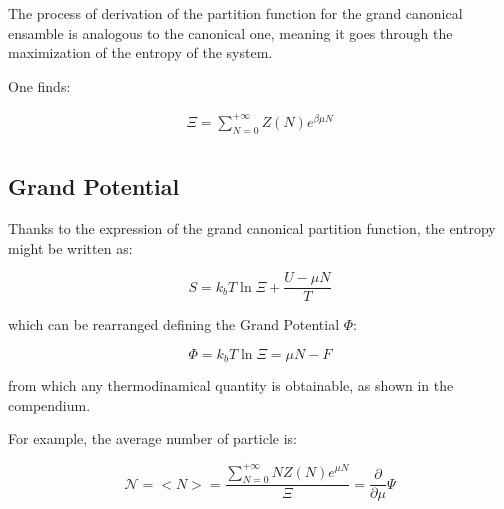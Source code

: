 \documentclass{article}
\begin{document}
The process of derivation of the partition function for the grand canonical ensamble is analogous to the canonical one,
meaning it goes through the maximization of the entropy of the system.

One finds:

\begin{equation}
    \begin{aligned}
        \Xi= \sum_{N=0}^{+\infty}Z(N)e^{\beta\mu N} \\
    \end{aligned}
\end{equation}

\subsection{Grand Potential}

Thanks to the expression of the grand canonical partition function, the
entropy might be written as:

\begin{equation}
    S= k_bT\ln{\Xi}+\frac{U-\mu N}{T}
\end{equation}

which can be rearranged defining the Grand Potential $\Phi$:

\begin{equation}
    \Phi=k_bT\ln{\Xi}=\mu N-F
\end{equation}

from which any thermodinamical quantity is obtainable, as shown in the compendium.

For example, the average number of particle is:

\begin{equation}
    \mathcal{N}=<N>=\frac{\sum_{N=0}^{+\infty} N Z(N)e^{\mu N}}{\Xi}= \frac{\partial}{\partial \mu}\Psi
\end{equation}
\end{document}
